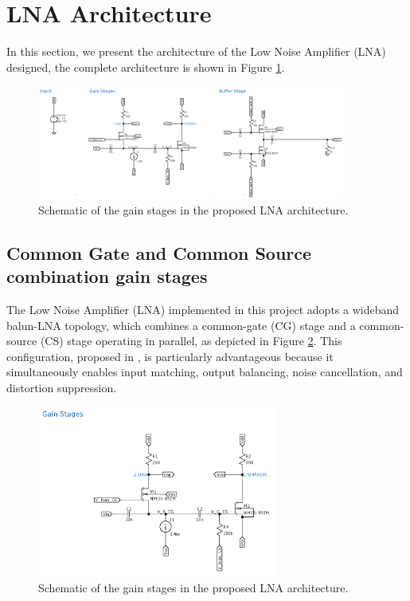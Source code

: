 \section{LNA Architecture}

In this section, we present the architecture of the Low Noise Amplifier (LNA) designed, the complete architecture is shown in Figure \ref{fig:schem-lna}. 

\begin{figure}[H]
    \centering
    \includegraphics[width=0.9\textwidth]{Images/schem-LNA.png}
    \caption{Schematic of the gain stages in the proposed LNA architecture.}
    \label{fig:schem-lna}
\end{figure}

\subsection{Common Gate and Common Source combination gain stages}

The Low Noise Amplifier (LNA) implemented in this project adopts a wideband balun-LNA topology, which combines a common-gate (CG) stage and a common-source (CS) stage operating in parallel, as depicted in Figure \ref{fig:schem-gain-stages}. This configuration, proposed in \cite{Blaakmeer2008}, is particularly advantageous because it simultaneously enables input matching, output balancing, noise cancellation, and distortion suppression.

\begin{figure}[H]
    \centering
    \includegraphics[width=0.7\textwidth]{Images/schem-GainStages.png}
    \caption{Schematic of the gain stages in the proposed LNA architecture.}
    \label{fig:schem-gain-stages}
\end{figure}

